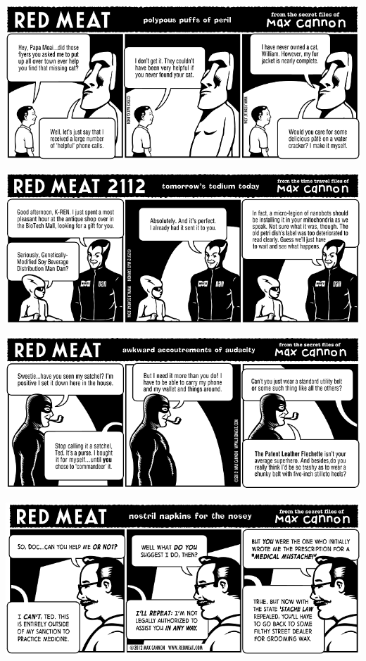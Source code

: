 \documentclass[a4paper,twoside,11pt]{article}
\begin{document}
\includegraphics[width=\textwidth]{redmeat_2012-02-07.png}



\includegraphics[width=\textwidth]{redmeat_2012-02-14.png}



\includegraphics[width=\textwidth]{redmeat_2012-02-21.png}



\includegraphics[width=\textwidth]{redmeat_2012-02-28.png}
\end{document}
